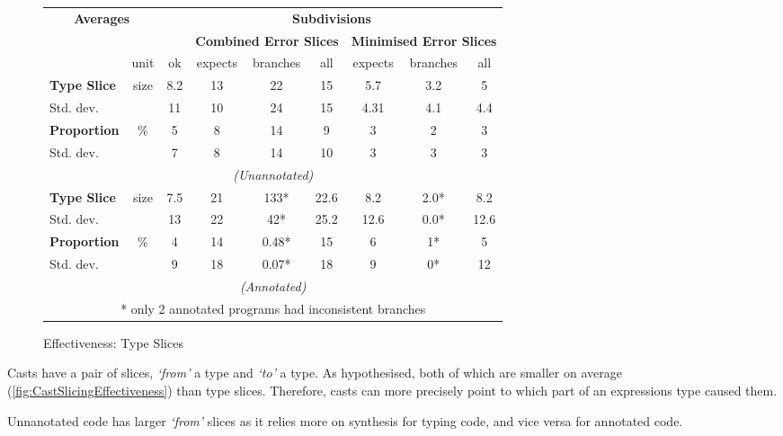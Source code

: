 \begin{figure}[h]
  \centering
  \begin{tabular}{lc|c|ccc|ccc}
  \multicolumn{2}{c}{\textbf{Averages}} & \multicolumn{7}{c}{\textbf{Subdivisions}}\\
  & & & \multicolumn{3}{c|}{\textbf{Combined Error Slices}} & \multicolumn{3}{c}{\textbf{Minimised Error Slices}}\\ 
   & unit & ok & expects & branches & all & expects & branches & all\\
   \hline
   \textbf{Type Slice} & size &  8.2 & 13 & 22 & 15&  5.7 & 3.2 & 5 \\
   Std. dev. &  				 &  11 & 10 & 24 & 15&    4.31 & 4.1 & 4.4 \\
   \textbf{Proportion}& \%    & 5 & 8 & 14 & 9&        3  & 2 & 3 \\
   Std. dev. &  				 &  7 & 8 & 14 & 10&      3 & 3 & 3 \\
   \multicolumn{9}{c}{\textit{(Unannotated)}}\\
   \textbf{Type Slice} & size &  7.5 & 21 & 133* & 22.6 &8.2&  2.0* & 8.2  \\
   Std. dev. 			&    &  13 & 22 & 42* & 25.2& 12.6&  0.0* & 12.6  \\
   \textbf{Proportion}& \% 	 & 4 & 14 & 0.48* & 15&  6&    1* & 5  \\
   Std. dev. &  				 &  9 & 18 & 0.07* & 18&   9&    0* & 12  \\
   \multicolumn{9}{c}{\textit{(Annotated)}}\\
   \multicolumn{9}{c}{* only 2 annotated programs had inconsistent branches}
  \end{tabular}
  \caption{Effectiveness: Type Slices}
\label{fig:TypeSlicingEffectiveness}
\end{figure}
Casts have a pair of slices, \textit{`from'} a type and \textit{`to'} a type. As hypothesised, both of which are smaller on average (\cref{fig:CastSlicingEffectiveness}) than type slices. Therefore, casts can more precisely point to which part of an expressions type caused them.

Unnanotated code has larger \textit{`from'} slices as it relies more on synthesis for typing code, and vice versa for annotated code.




